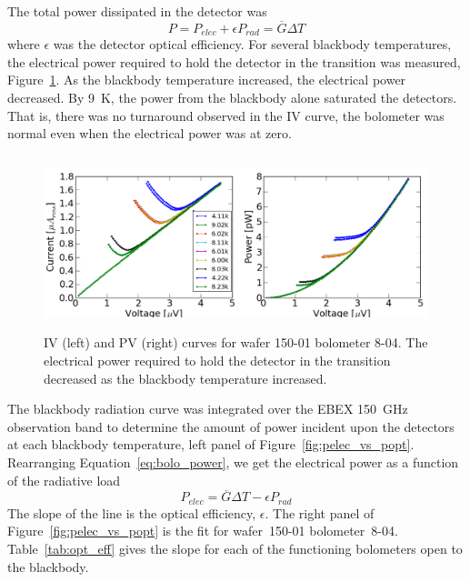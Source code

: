 The total power dissipated in the detector was
\begin{equation}
P = P_{elec} + \epsilon P_{rad} = \overline{G} \Delta T
\label{eq:bolo_power}
\end{equation}
where $\epsilon$ was the detector optical efficiency. 
For several blackbody temperatures, the electrical power required to hold the detector in the transition was measured, Figure~\ref{fig:opt_eff_bb_curves}.
As the blackbody temperature increased, the electrical power decreased.  
By 9~K, the power from the blackbody alone saturated the detectors. 
That is, there was no turnaround observed in the IV curve, the bolometer was normal even when the electrical power was at zero. 

\begin{figure}[htp]
\begin{center}
\includegraphics[height=2in]{figures/SqCh2_Ch1_all_bb_curves.png}
\caption{IV (left) and PV (right) curves for wafer 150-01 bolometer 8-04. The electrical power required to hold the detector in the transition decreased as the blackbody temperature increased. 
\label{fig:opt_eff_bb_curves} }
\end{center}
\end{figure}

The blackbody radiation curve was integrated over the \ac{EBEX} 150~GHz observation band to determine the amount of power incident upon the detectors at each blackbody temperature, left panel of Figure~\ref{fig:pelec_vs_popt}.
Rearranging Equation~\ref{eq:bolo_power}, we get the electrical power as a function of the radiative load
\begin{equation}
P_{elec} = \overline{G} \Delta T -  \epsilon P_{rad} 
\end{equation}
The slope of the line is the optical efficiency, $\epsilon$.
The right panel of Figure~\ref{fig:pelec_vs_popt} is the fit for wafer~150-01 bolometer~8-04. 
Table~\ref{tab:opt_eff} gives the slope for each of the functioning bolometers open to the blackbody. 


